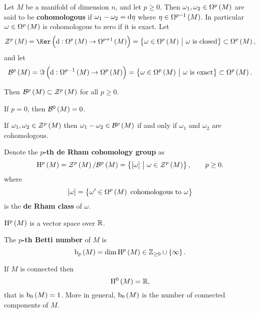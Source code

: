 \begin{definition}
Let $ M $ be a manifold of dimension $ n $, and let $ p \ge 0 $. Then $ \omega_1, \omega_2 \in \Omega^p\br{M} $ are said to be \textbf{cohomologous} if $ \omega_1 - \omega_2 = \mathrm{d}\eta $ where $ \eta \in \Omega^{p - 1}\br{M} $. In particular $ \omega \in \Omega^p\br{M} $ is cohomologous to zero if it is exact. Let
$$ \ZZZ^p\br{M} = \Ker \br{\d : \Omega^p\br{M} \to \Omega^{p + 1}\br{M}} = \cbr{\omega \in \Omega^p\br{M} \st \omega \ \text{is closed}} \subset \Omega^p\br{M}, $$
and let
$$ \BBB^p\br{M} = \Im \br{\d : \Omega^{p - 1}\br{M} \to \Omega^p\br{M}} = \cbr{\omega \in \Omega^p\br{M} \st \omega \ \text{is exact}} \subset \Omega^p\br{M}. $$
\end{definition}

Then $ \BBB^p\br{M} \subset \ZZZ^p\br{M} $ for all $ p \ge 0 $.

\begin{notation*}
If $ p = 0 $, then $ \BBB^0\br{M} = 0 $.
\end{notation*}

\begin{note*}
If $ \omega_1, \omega_2 \in \ZZZ^p\br{M} $ then $ \omega_1 - \omega_2 \in \BBB^p\br{M} $ if and only if $ \omega_1 $ and $ \omega_2 $ are cohomologous.
\end{note*}

\begin{definition}
Denote the \textbf{$ p $-th de Rham cohomology group} as
$$ \H^p\br{M} = \ZZZ^p\br{M} / \BBB^p\br{M} = \cbr{\sbr{\omega} \st \omega \in \ZZZ^p\br{M}}, \qquad p \ge 0. $$
where
$$ \sbr{\omega} = \cbr{\omega' \in \Omega^p\br{M} \ \text{cohomologous to} \ \omega} $$
is the \textbf{de Rham class} of $ \omega $.
\end{definition}

\begin{remark*}
$ \H^p\br{M} $ is a vector space over $ \mathbb{R} $.
\end{remark*}

\begin{definition}
The \textbf{$ p $-th Betti number} of $ M $ is
$$ \b_p\br{M} = \dim \H^p\br{M} \in \ZZ_{\ge 0} \cup \cbr{\infty}. $$
\end{definition}

\begin{proposition}
If $ M $ is connected then
$$ \H^0\br{M} = \RR, $$
that is $ \b_0\br{M} = 1 $. More in general, $ \b_0\br{M} $ is the number of connected components of $ M $.
\end{proposition}

